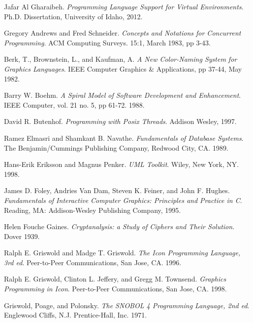 \begin{thebibliography}{ABCD}

   Jafar Al Gharaibeh.  \emph{Programming Language Support
    for Virtual Environments}. Ph.D. Dissertation, University of Idaho, 2012.

   Gregory Andrews and Fred Schneider.
    \emph{Concepts and Notations for Concurrent Programming}.
    ACM Computing Surveys. 15:1, March 1983, pp 3-43.

   Berk, T., Brownstein, L., and Kaufman, A.
    \emph{A New Color-Naming System for Graphics Languages}.
    IEEE Computer Graphics \& Applications, pp 37-44, May 1982.

   Barry W. Boehm.
    \emph{A Spiral Model of Software Development and Enhancement}.
    IEEE Computer, vol. 21 no. 5, pp 61-72. 1988.

   David R. Butenhof.
    \emph{Programming with Posix Threads}. Addison Wesley, 1997.

   Ramez Elmasri and Shamkant B. Navathe.
    \emph{Fundamentals of Database Systems}.
    The Benjamin/Cummings Publishing Company, Redwood City, CA. 1989.

   Hans-Erik Eriksson and Magnus Penker.
    \emph{UML Toolkit}. Wiley, New York, NY.  1998.

   James D. Foley, Andries Van Dam, Steven K. Feiner, and John
    F. Hughes.  \emph{Fundamentals of Interactive Computer Graphics: Principles
      and Practice in C}. Reading, MA: Addison-Wesley Publishing Company, 1995.

   Helen Fouche Gaines.
    \emph{Cryptanalysis: a Study of Ciphers and Their Solution}. Dover 1939.

   Ralph E. Griswold and Madge T. Griswold.
    \emph{The Icon Programming Language, 3rd ed}. Peer-to-Peer Communications,
    San Jose, CA. 1996.

   Ralph E. Griswold, Clinton L. Jeffery, and Gregg
    M. Townsend. \emph{Graphics Programming in Icon}. Peer-to-Peer
    Communications, San Jose, CA. 1998.

   Griswold, Poage, and Polonsky.
    \emph{The SNOBOL 4 Programming Language, 2nd ed}.
    Englewood Cliffs, N.J. Prentice-Hall, Inc. 1971.


\end{thebibliography}
